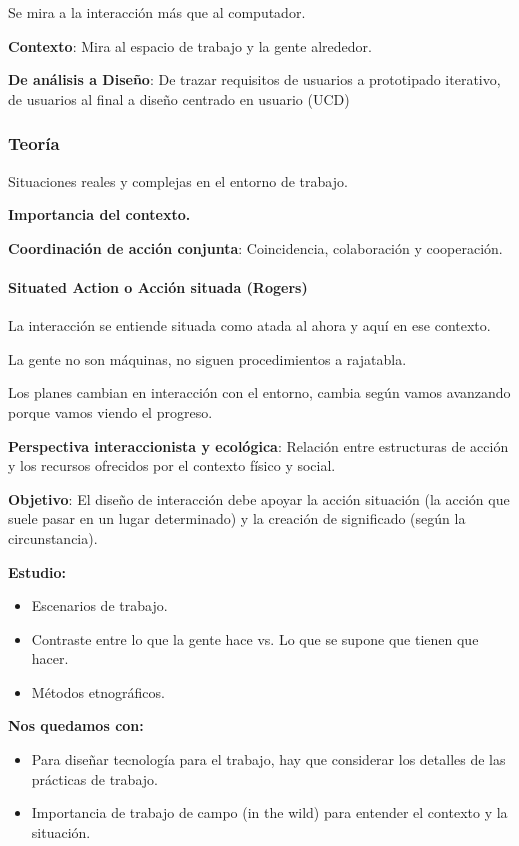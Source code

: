 \documentclass[12pt, twoside, openright]{report} %
\begin{document}
Se mira a la interacción más que al computador.

\textbf{Contexto}: Mira al espacio de trabajo y la gente alrededor.

\textbf{De análisis a Diseño}: De trazar requisitos de usuarios a
prototipado iterativo, de usuarios al final a diseño centrado en usuario
(UCD)

\subsubsection{Teoría}

Situaciones reales y complejas en el entorno de trabajo.

\textbf{Importancia del contexto.}

\textbf{Coordinación de acción conjunta}: Coincidencia, colaboración y
cooperación.

\paragraph{Situated Action o Acción situada (Rogers)}

La interacción se entiende situada como atada al ahora y aquí en ese
contexto.

La gente no son máquinas, no siguen procedimientos a rajatabla.

Los planes cambian en interacción con el entorno, cambia según vamos
avanzando porque vamos viendo el progreso.

\textbf{Perspectiva interaccionista y ecológica}: Relación entre
estructuras de acción y los recursos ofrecidos por el contexto físico y
social.

\textbf{Objetivo}: El diseño de interacción debe apoyar la acción
situación (la acción que suele pasar en un lugar determinado) y la
creación de significado (según la circunstancia).

\textbf{Estudio:}

\begin{itemize}
	\item Escenarios de trabajo.
	\item Contraste entre lo que la gente hace vs. Lo que se supone que tienen que hacer.
	\item Métodos etnográficos.
\end{itemize}

\textbf{Nos quedamos con:}
\begin{itemize}
	\item Para diseñar tecnología para el trabajo, hay que considerar los detalles de las prácticas de trabajo.
	\item Importancia de trabajo de campo (in the wild) para entender el contexto y la situación.
\end{itemize}
\end{document}

